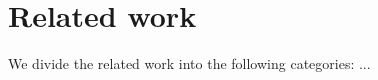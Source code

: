 \documentclass[../main]{subfiles}
\begin{document}
\chapter{Related work}
\label{ch:related_work}
We divide the related work into the following categories:  ...
\end{document}
